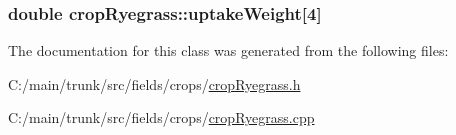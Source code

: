 \label{classcrop_ryegrass_ae11486448ac560cb05033e804aea5316}
\hypertarget{classcrop_ryegrass_a445c84d8258d5047e62dcd3d222cf8bd}{
\subsubsection[{uptakeWeight}]{\setlength{\rightskip}{0pt plus 5cm}double {\bf cropRyegrass::uptakeWeight}\mbox{[}4\mbox{]}}}
\label{classcrop_ryegrass_a445c84d8258d5047e62dcd3d222cf8bd}


The documentation for this class was generated from the following files:\begin{DoxyCompactItemize}
\item 
C:/main/trunk/src/fields/crops/\hyperlink{crop_ryegrass_8h}{cropRyegrass.h}\item 
C:/main/trunk/src/fields/crops/\hyperlink{crop_ryegrass_8cpp}{cropRyegrass.cpp}\end{DoxyCompactItemize}
